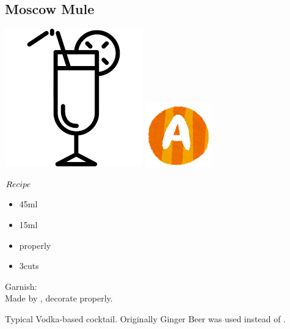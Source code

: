 \subsection{Moscow Mule}
\vspace{-7.4mm}
\hspace{39mm}
\includegraphics[scale=.07]{cocktail_glass_tall.png}
\includegraphics[scale=.12]{capital_a.png}
\vspace{2.5mm}
\begin{itembox}[l]{\boldmath $Recipe$}
\begin{itemize}
\setlength{\parskip}{0cm}
\setlength{\itemsep}{0cm}
\item \vodka 45ml
\item \limj 15ml
\item \ga properly
\item \lime 3cuts
\end{itemize}
\vspace{-4mm}
Garnish: \mint\\
Made by \build, decorate \lime properly.
\end{itembox}
Typical Vodka-based cocktail. Originally Ginger Beer was used instead of \ga
\hspace{-1mm}.
